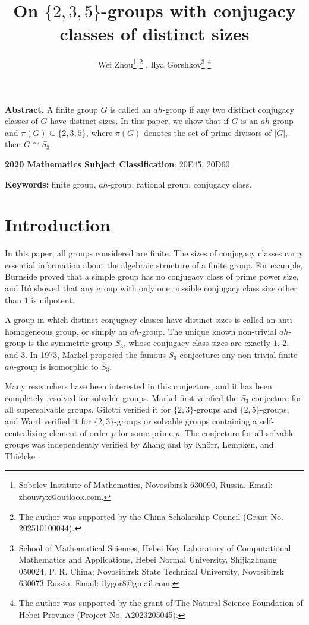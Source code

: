 \documentclass[11pt]{article}
\title{On $\{2,3,5\}$-groups with conjugacy classes of distinct sizes}
\author{
Wei Zhou\thanks{Sobolev Institute of Mathematics, Novosibirsk 630090, Russia.
Email: zhouwyx@outlook.com.}
\thanks{The author was supported by the China Scholarship Council (Grant No. 202510100044).}
\footnotemark[5]
,
Ilya Gorshkov\thanks{School of Mathematical Sciences, Hebei Key Laboratory of Computational Mathematics and Applications, Hebei Normal University, Shijiazhuang 050024, P. R. China; Novosibirsk State Technical University, Novosibirsk 630073 Russia. Email: ilygor8@gmail.com.}
\thanks{The author was supported by the grant of The Natural Science Foundation of Hebei Province (Project No. A2023205045).} 
\footnotemark[5]
}
\date{}
\begin{document}

\maketitle


\noindent\textbf{Abstract.} 
    A finite group $G$ is called an $ah$-group 
    if any two distinct conjugacy classes of $G$ have distinct sizes.
    In this paper, we show that if $G$ is an $ah$-group and $\pi(G) \subseteq \{2,3,5\}$, 
    where $\pi(G)$ denotes the set of prime divisors of $|G|$, then $G \cong S_3$.

\noindent\textbf{2020 Mathematics Subject Classification}: 20E45, 20D60.

\noindent\textbf{Keywords:} finite group, $ah$-group, rational group, conjugacy class.

\section*{Introduction}

    In this paper, all groups considered are finite. 
    The sizes of conjugacy classes carry essential information about the algebraic structure of a finite group. 
    For example, Burnside \cite{Burnside} proved that a simple group has no conjugacy class of prime power size, 
    and Itô \cite{Ito1953} showed that any group with only one possible conjugacy class size other than $1$ is nilpotent.

    A group in which distinct conjugacy classes have distinct sizes is called an anti-homogeneous group, or simply an $ah$-group. 
    The unique known non-trivial $ah$-group is the symmetric group $S_3$, whose conjugacy class sizes are exactly $1$, $2$, and $3$. 
    In 1973, Markel \cite{Markel1973} proposed the famous $S_3$-conjecture: any non-trivial finite $ah$-group is isomorphic to $S_3$.

    Many researchers have been interested in this conjecture, and it has been completely resolved for solvable groups. 
    Markel \cite{Markel1973} first verified the $S_3$-conjecture for all supersolvable groups. 
    Gilotti \cite{Gilotti1975} verified it for $\{2,3\}$-groups and $\{2,5\}$-groups, 
    and Ward \cite{Ward1970} verified it for $\{2,3\}$-groups 
    or solvable groups containing a self-centralizing element of order $p$ for some prime $p$. 
    The conjecture for all solvable groups was independently verified 
    by Zhang \cite{zhang1994} 
    and by Knörr, Lempken, and Thielcke \cite{Knorr1995}.
\end{document}
